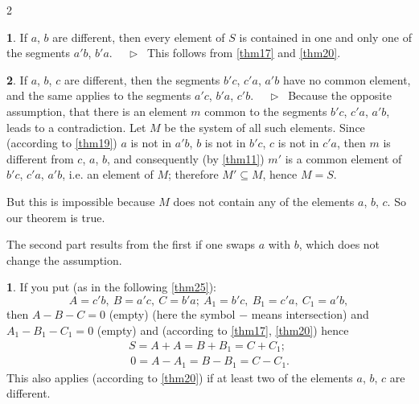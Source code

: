 \documentclass[leqno,hidelinks,10pt]{article}
\theoremstyle{definition}
\newtheorem{satz}{\protect\satzname}
\newtheorem*{zusatz}{\protect\zusatzname}
\newcommand{\satzname}{}
\newcommand{\zusatzname}{}
\renewcommand{\satzname}{\hspace{-4pt}.\ Satz}%
\renewcommand{\zusatzname}{Zusatz}%
\renewcommand{\satzname}{\hspace{-4pt}.\ Theorem}%
\renewcommand{\zusatzname}{Corollary}%
\newcommand\Beweis{\medskip \newline $ \phantom{'.'} \rhd \ $}%
\newcommand{\partof}{\subseteq}
\newcommand{\sref}[1]{\underline{\ref{#1}}}%
\begin{document}
\begin{paracol}{2}
\begin{rightcolumn}
\begin{satz}\label{thm23}
If $a$, $b$ are different, then every element of $S$ is contained in one and only
one of the segments $a'b$, $b'a$.
\Beweis
This follows from \sref{thm17} and \sref{thm20}.
\end{satz}

\begin{satz}\label{thm24}
If $a$, $b$, $c$ are different, then the segments $b'c$, $c'a$, $a'b$ have no
common element, and the same applies to the segments $a'c$, $b'a$, $c'b$.
\Beweis
Because the opposite assumption, that there is an element $m$ common to the segments
$b'c$, $c'a$, $a'b$, leads to a contradiction. Let $M$ be the system of all such
elements. Since (according to \sref{thm19}) $a$ is not in $a'b$, $b$ is not in $b'c$,
$c$ is not in $c'a$, then $m$ is different from $c$, $a$, $b$, and consequently
(by \sref{thm11}) $m'$ is a common element of $b'c$, $c'a$, $a'b$, i.e. an element
of $M$; therefore $M' \partof M$, hence  $M=S$.

But this is impossible because $M$ does not contain any of the elements $a$, $b$,
$c$. So our theorem is true.

The second part results from the first if one swaps $a$ with $b$, which does not
change the assumption.
\end{satz}

\begin{zusatz}\label{corollary1}
If you put (as in the following \sref{thm25}):
\[
    A = c'b,\ B = a'c,\ C = b'a;\  A_1 = b'c,\ B_1 = c'a,\ C_1 = a'b,
\]
then $A - B - C = 0$ (empty) (here the symbol $-$ means intersection) and
$A_1 - B_1 - C_1 = 0$ (empty) and (according to \sref{thm17}, \sref{thm20}) hence
\begin{gather*}
    S = A + A = B + B_1 = C + C_1; \\
    \,0 = A - A_1 = B - B_1 = C - C_1.
\end{gather*}
This also applies (according to \sref{thm20}) if at least two of the elements
$a$, $b$, $c$ are different.
\end{zusatz}


\end{rightcolumn}
\end{paracol}
\end{document}

